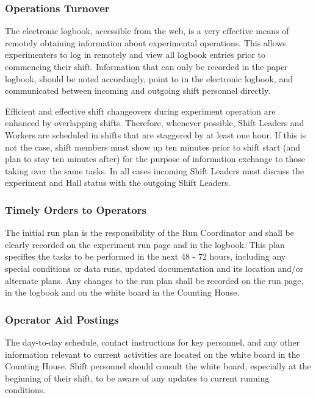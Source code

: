 \documentclass[11pt]{article}
\begin{document}
\subsubsection{Operations Turnover}
\indent

The electronic logbook, accessible from the web, is a very effective means 
of remotely obtaining information about experimental operations. This allows 
experimenters to log in remotely and view all logbook 
entries prior to commencing their shift.
Information that can only be recorded in the paper logbook, should be
noted accordingly, point to in the electronic logbook, and communicated between incoming and outgoing shift 
personnel directly.

Efficient and effective shift changeovers during experiment operation 
are enhanced by overlapping shifts. Therefore, whenever possible, Shift Leaders 
and Workers are scheduled in shifts that are staggered by at least one hour.  If this is not the case, shift members must show
up ten minutes prior to shift start (and plan to stay ten minutes after) for the
purpose of information exchange to those taking over the same tasks.
In all cases incoming Shift Leaders must discuss the experiment and Hall status with the
outgoing Shift Leaders.

\subsubsection{Timely Orders to Operators}
\indent

The initial run plan is the responsibility of the Run Coordinator and
shall be clearly recorded on the experiment run page and in the logbook. This plan specifies
the tasks to be performed in the next 48 - 72 hours, including
any special conditions or data runs, updated documentation and its
location and/or alternate plans. Any changes to the run plan shall
be recorded on the run page, in the logbook and on the white board in the Counting House.

\subsubsection{Operator Aid Postings}
\indent

The day-to-day schedule, contact instructions for key personnel, and 
any other information relevant to current activities are located
on the white board in the Counting House. Shift personnel should
consult the white board, especially at the beginning
of their shift, to be aware of any updates to current running conditions.
\end{document}
